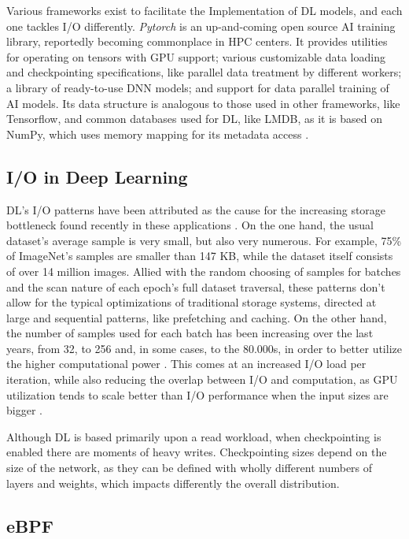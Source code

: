 \documentclass[conference]{IEEEtran}
\begin{document}
Various frameworks exist to facilitate the Implementation of DL models, and each one tackles I/O differently. \textit{Pytorch} \cite{pytorch} is an up-and-coming open source AI training library, reportedly becoming commonplace in HPC centers. It provides utilities for operating on tensors with GPU support; various customizable data loading and checkpointing specifications, like parallel data treatment by different workers; a library of ready-to-use DNN models; and support for data parallel training of AI models. Its data structure is analogous to those used in other frameworks, like Tensorflow, and common databases used for DL, like LMDB, as it is based on NumPy, which uses memory mapping for its metadata access \cite{LMDB}.

\subsection{I/O in Deep Learning}

DL's I/O patterns have been attributed as the cause for the increasing storage bottleneck found recently in these applications \cite{beegfs}. On the one hand, the usual dataset's average sample is very small, but also very numerous. For example, 75\% of ImageNet's samples are smaller than 147 KB, while the dataset itself consists of over 14 million images. Allied with the random choosing of samples for batches and the scan nature of each epoch's full dataset traversal, these patterns don't allow for the typical optimizations of traditional storage systems, directed at large and sequential patterns, like prefetching and caching. On the other hand, the number of samples used for each batch has been increasing over the last years, from 32, to 256 and, in some cases, to the 80.000s, in order to better utilize the higher computational power \cite{nvme}. This comes at an increased I/O load per iteration, while also reducing the overlap between I/O and computation, as GPU utilization tends to scale better than I/O performance when the input sizes are bigger \cite{TFbenchmark}. 

Although DL is based primarily upon a read workload, when checkpointing is enabled there are moments of heavy writes. Checkpointing sizes depend on the size of the network, as they can be defined with wholly different numbers of layers and weights, which impacts differently the overall distribution.

\subsection{eBPF}
\end{document}
